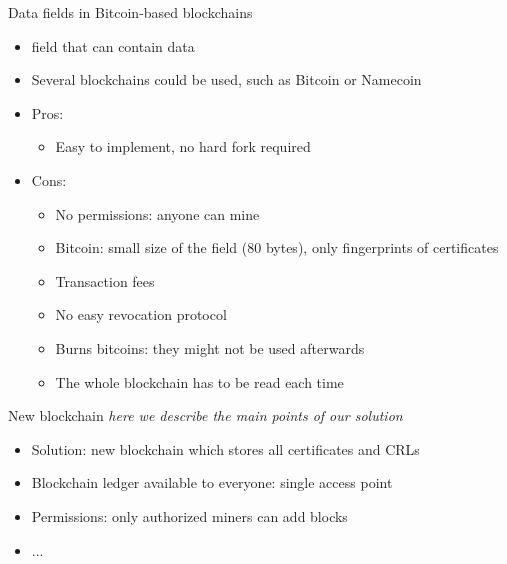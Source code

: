 \begin{frame}{Data fields in Bitcoin-based blockchains}

\begin{itemize}
\item {} field that can contain data
\item Several blockchains could be used, such as Bitcoin or Namecoin
\item Pros:
\begin{itemize}
\item Easy to implement, no hard fork required
\end{itemize}
\item Cons:
\begin{itemize}
\item No permissions: anyone can mine
\item Bitcoin: small size of the field (80 bytes), only fingerprints of certificates
\item Transaction fees
\item No easy revocation protocol
\item Burns bitcoins: they might not be used afterwards
\item The whole blockchain has to be read each time
\end{itemize}

\end{itemize}

\end{frame}





\begin{frame}{New blockchain}
\emph{here we describe the main points of our solution}

\begin{itemize}
\item Solution: new blockchain which stores all certificates and CRLs
\item Blockchain ledger available to everyone: single access point
\item Permissions: only authorized miners can add blocks
\item ...


\end{itemize}
\end{frame}


